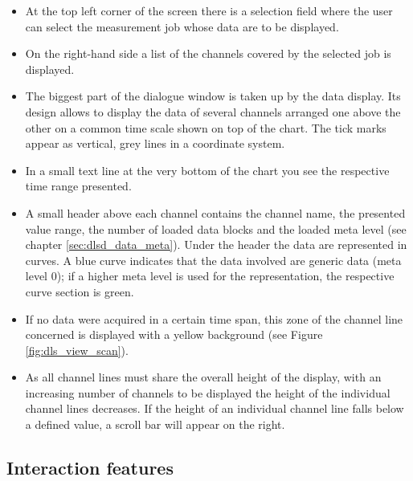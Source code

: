 \documentclass[a4paper,12pt,BCOR6mm,bibtotoc,idxtotoc]{scrbook}
\begin{document}
\begin{itemize} 
\item At the top left corner of the screen there is a selection field where the user can select the measurement job whose data are to be displayed. 
\item On the right-hand side a list of the channels covered by the selected job is displayed. 
\item The biggest part of the dialogue window is taken up by the data display. Its design allows to display the data of several channels arranged one above the other on a common time scale shown on top of the chart. The tick marks appear as vertical, grey lines in a coordinate system. 
\item In a small text line at the very bottom of the chart you see the respective time range presented. 
\item A small header above each channel contains the channel name, the presented value range, the number of loaded data blocks and the loaded meta level (see chapter \ref{sec:dlsd_data_meta}). Under the header the data are represented in curves. A blue curve indicates that the data involved are generic data (meta level 0); if a higher meta level is used for the representation, the respective curve section is green. 
\item If no data were acquired in a certain time span, this zone of the channel line concerned is displayed with a yellow background (see Figure \ref{fig:dls_view_scan}). 
\item As all channel lines must share the overall height of the display, with an increasing number of channels to be displayed the height of the individual channel lines decreases. If the height of an individual channel line falls below a defined value, a scroll bar will appear on the right. \end{itemize}


\subsection{Interaction features}
\end{document}

